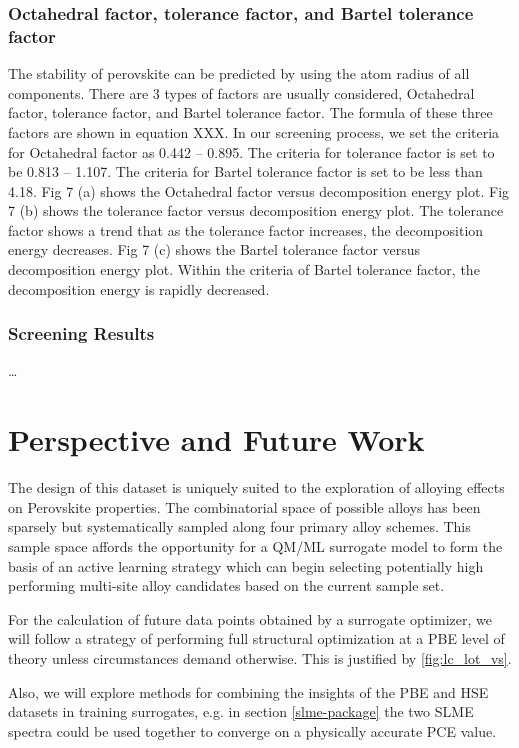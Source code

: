 \documentclass[twoside, twocolumn, 9pt, draft]{article}
\begin{document}
\subsubsection*{Octahedral factor, tolerance factor, and Bartel tolerance factor}
\label{sec:org12325c3}
The stability of perovskite can be predicted by using the atom radius of
all components. There are 3 types of factors are usually considered,
Octahedral factor, tolerance factor, and Bartel tolerance factor. The
formula of these three factors are shown in equation XXX. In our
screening process, we set the criteria for Octahedral factor as 0.442 --
0.895. The criteria for tolerance factor is set to be 0.813 -- 1.107.
The criteria for Bartel tolerance factor is set to be less than 4.18.
Fig 7 (a) shows the Octahedral factor versus decomposition energy plot.
Fig 7 (b) shows the tolerance factor versus decomposition energy plot.
The tolerance factor shows a trend that as the tolerance factor
increases, the decomposition energy decreases. Fig 7 (c) shows the
Bartel tolerance factor versus decomposition energy plot. Within the
criteria of Bartel tolerance factor, the decomposition energy is rapidly
decreased.

\subsubsection*{Screening Results}
\label{sec:org633f815}
\ldots{}\\

\section*{Perspective and Future Work}
\label{sec:org086bca8}
The design of this dataset is uniquely suited to the exploration of
alloying effects on Perovskite properties. The combinatorial space of
possible alloys has been sparsely but systematically sampled along
four primary alloy schemes. This sample space affords the opportunity
for a QM/ML surrogate model to form the basis of an active learning
strategy which can begin selecting potentially high performing
multi-site alloy candidates based on the current sample set.

For the calculation of future data points obtained by a surrogate
optimizer, we will follow a strategy of performing full structural
optimization at a PBE level of theory unless circumstances demand
otherwise. This is justified by \ref{fig:lc_lot_vs}.

Also, we will explore methods for combining the insights of the PBE
and HSE datasets in training surrogates, e.g. in section
\ref{slme-package} the two SLME spectra could be used together to
converge on a physically accurate PCE value.
\end{document}
